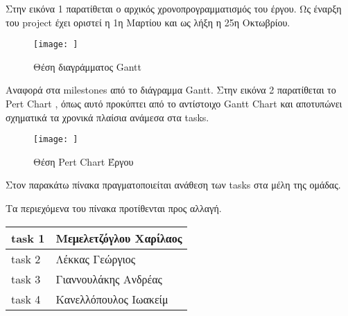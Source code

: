 \documentclass{../ol-softwaremanual}
\begin{document}
\vspace{10pt}
Στην εικόνα 1 παρατίθεται ο αρχικός χρονοπρογραμματισμός του έργου. Ως έναρξη του \en project \gr έχει οριστεί η 1η Μαρτίου και ως λήξη η 25η Οκτωβρίου.

\vspace{20pt}

\vspace{50pt}
		\flushleft
        \begin{figure}[htbp!]
			
			    \texttt{[image:   ]}
			    \caption{Θέση διαγράμματος \en Gantt \gr}
			
			
		\end{figure}

\vspace{20pt}
Αναφορά στα \en milestones \gr από το διάγραμμα \en Gantt. \gr
\vspace{30pt}
		\flushleft
		Στην εικόνα 2 παρατίθεται το \en Pert Chart \gr, όπως αυτό προκύπτει από το αντίστοιχο \en Gantt Chart \gr και αποτυπώνει σχηματικά τα χρονικά πλαίσια ανάμεσα στα \en tasks.\gr
		
		\begin{figure}[htbp!]
			
			\texttt{[image: ]}
						\caption{Θέση \en Pert Chart \gr Έργου}
		\end{figure}

\newpage

\vspace{20pt}
\flushleft
 Στον παρακάτω πίνακα πραγματοποιείται ανάθεση \en των tasks \gr στα μέλη της ομάδας.
 
 \vspace{20pt}
 
 Τα περιεχόμενα του πίνακα προτίθενται προς αλλαγή.
 \vspace{20pt}
 \begin{table}[htbp!]
		
		\begin{tabular}{|l|l|}
		\hline
			\en task 1 \gr & Μεμελετζόγλου Χαρίλαος    \\ 
			\hline
			 \en task 2 \gr    &      Λέκκας Γεώργιος      \\
			\hline
			 \en task 3  \gr      &   Γιαννουλάκης Ανδρέας        \\
			\hline
			 \en task 4 \gr       &  Κανελλόπουλος Ιωακείμ         \\
			\hline
		\end{tabular}
	\end{table}
\end{document}
